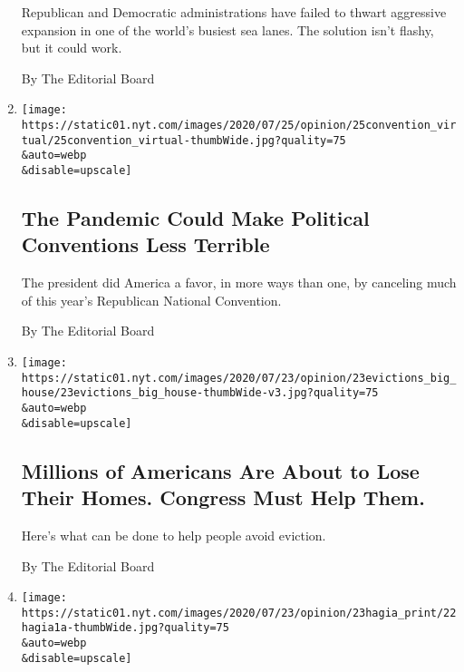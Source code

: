 \begin{enumerate}
  Republican and Democratic administrations have failed to thwart
  aggressive expansion in one of the world's busiest sea lanes. The
  solution isn't flashy, but it could work.

  By The Editorial Board
\item
  \href{/2020/07/25/opinion/sunday/republican-convention-trump.html}{}

  \texttt{[image: https://static01.nyt.com/images/2020/07/25/opinion/25convention\_virtual/25convention\_virtual-thumbWide.jpg?quality=75\\\&auto=webp\\\&disable=upscale]}

  \hypertarget{the-pandemic-could-make-political-conventions-less-terrible}{%
  \subsection{The Pandemic Could Make Political Conventions Less
  Terrible}\label{the-pandemic-could-make-political-conventions-less-terrible}}

  The president did America a favor, in more ways than one, by canceling
  much of this year's Republican National Convention.

  By The Editorial Board
\item
  \href{/2020/07/23/opinion/coronavirus-evictions-rent.html}{}

  \texttt{[image: https://static01.nyt.com/images/2020/07/23/opinion/23evictions\_big\_house/23evictions\_big\_house-thumbWide-v3.jpg?quality=75\\\&auto=webp\\\&disable=upscale]}

  \hypertarget{millions-of-americans-are-about-to-lose-their-homes-congress-must-help-them}{%
  \subsection{Millions of Americans Are About to Lose Their Homes.
  Congress Must Help
  Them.}\label{millions-of-americans-are-about-to-lose-their-homes-congress-must-help-them}}

  Here's what can be done to help people avoid eviction.

  By The Editorial Board
\item
  \href{/2020/07/22/opinion/hagia-sophia-mosque.html}{}

  \texttt{[image: https://static01.nyt.com/images/2020/07/23/opinion/23hagia\_print/22hagia1a-thumbWide.jpg?quality=75\\\&auto=webp\\\&disable=upscale]}

  \hypertarget{the-hagia-sophia-was-a-cathedral-a-mosque-and-a-museum-its-converting-again}{%
}
\end{enumerate}
